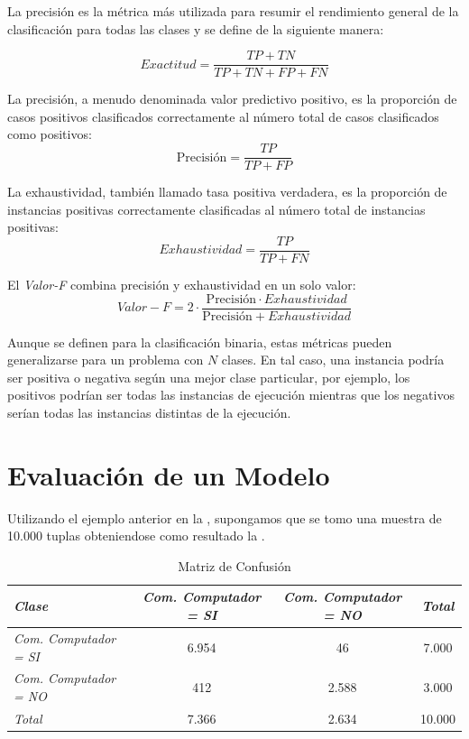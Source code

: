 La precisión es la métrica más utilizada para resumir el rendimiento general de la clasificación para todas las clases y se define de la siguiente manera:

\begin{equation}
Exactitud = \frac{TP + TN}{TP + TN + FP + FN}\label{eq3:exactitud}
\end{equation}

La precisión, a menudo denominada valor predictivo positivo, es la proporción de casos positivos clasificados correctamente al número total de casos clasificados como positivos:
\begin{equation}
\mbox{Precisión} = \frac{TP}{TP + FP}\label{eq3:precision}
\end{equation}

La exhaustividad, también llamado tasa positiva verdadera, es la proporción de instancias positivas correctamente clasificadas al número total de instancias positivas:
\begin{equation}
Exhaustividad = \frac{TP}{TP + FN}\label{eq3:exaustividad}
\end{equation}


El \emph{Valor-F} combina precisión y exhaustividad en un solo valor:
\begin{equation}
Valor-F = 2 \cdot \frac{\mbox{Precisión} \cdot Exhaustividad}{\mbox{Precisión} + Exhaustividad}\label{eq3:valorf}
\end{equation}

Aunque se definen para la clasificación binaria, estas métricas pueden generalizarse para un problema con $N$ clases. En tal caso, una instancia podría ser positiva o negativa según una mejor clase particular, por ejemplo, los positivos podrían ser todas las instancias de ejecución mientras que los negativos serían todas las instancias distintas de la ejecución.

\section{Evaluación de un Modelo}

Utilizando el ejemplo anterior en la , supongamos que se tomo una muestra de 10.000 tuplas obteniendose como resultado la .


\begin{table}[!htbp]
	\begin{tabular}{|l|c|c|c|}
		\hline 
		\textit{Clase} & \textit{Com. Computador = SI}    &\textit{Com. Computador = NO} & \textit{Total}  \\
		\hline 
		\textit{Com. Computador = SI}	& 6.954   	& 46    	& 7.000     \\ 
		\hline 
		\textit{Com. Computador = NO}	& 412		& 2.588		& 3.000    	\\ 
		\hline
		\textit{Total}					& 7.366		& 2.634    	& 10.000	\\ 
		\hline
	\end{tabular}
    \caption{\label{tabla:MatrizConfusion}Matriz de Confusión}
\end{table}



